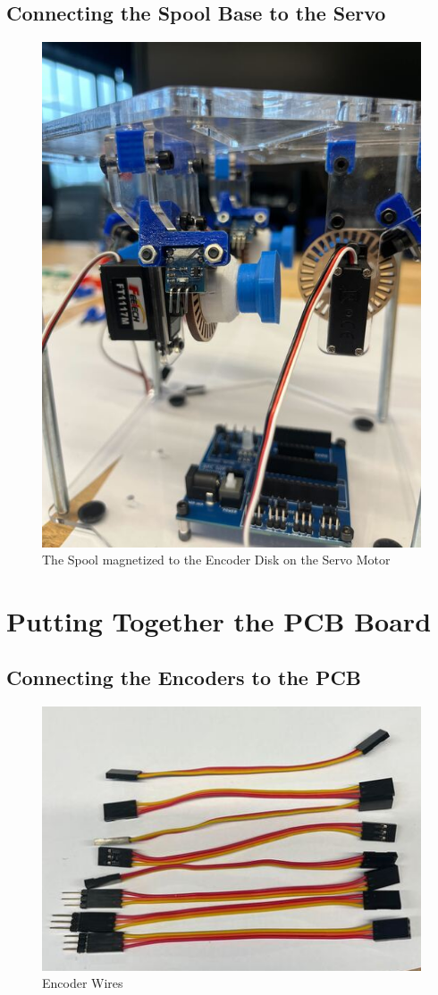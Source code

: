\documentclass{article}
\begin{document}
\subsection{Connecting the Spool Base to the Servo}
\begin{figure}[H]
    \centering
    \includegraphics[width=0.5\linewidth]{PCBImages/AttachingServos/attaching_servos_2.jpg}
    \caption{The Spool magnetized to the Encoder Disk on the Servo Motor}
    \label{fig:spool_attached_to_servo}
\end{figure}

\section{Putting Together the PCB Board}

\subsection{Connecting the Encoders to the PCB}
\begin{figure}[H]
    \centering
    \includegraphics[width=0.5\linewidth]{PCBImages/EncoderWires/encoder_wires_1.png}
    \caption{Encoder Wires}
    \label{fig:enter-label}
\end{figure}
\end{document}
